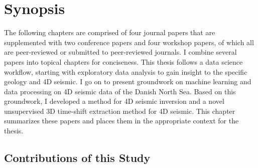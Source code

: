 \chapter{Synopsis}
\label{sec:synopsis}
The following chapters are comprised of four journal papers that are supplemented with two conference papers and four workshop papers, of which all are peer-reviewed or submitted to peer-reviewed journals. I combine several papers into topical chapters for conciseness. This thesis follows a data science workflow, starting with exploratory data analysis to gain insight to the specific geology and 4D seismic. I go on to present groundwork on machine learning and data processing on 4D seismic data of the Danish North Sea. Based on this groundwork, I developed a method for 4D seismic inversion and a novel unsupervised 3D time-shift extraction method for 4D seismic. This chapter summarizes these papers and places them in the appropriate context for the thesis.









\section{Contributions of this Study}

